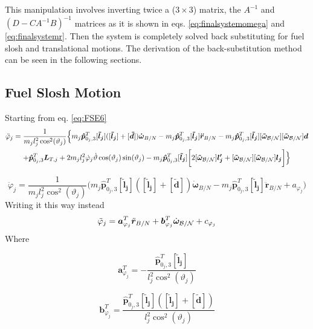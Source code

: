 \documentclass[]{BasiliskReportMemo}
\begin{document}
	This manipulation involves inverting twice a ($3\times 3$) matrix, the $A^{-1}$ and $(D-CA^{-1}B)^{-1}$ matrices as it is shown in eqs. \eqref{eq:finalsystemomega}  and \eqref{eq:finalsystemr}. Then the system is completely solved back substituting for fuel slosh and translational motions. The derivation of the back-substitution method can be seen in the following sections. 
	\\
	
	\subsection{Fuel Slosh Motion}
	Starting from eq. \eqref{eq:FSE6}
    \begin{multline}
	\ddot{\varphi}_j  =\frac{1}{m_j l_j^2 \cos^2(\vartheta_j)}\Big\{m_{j}\bm{\hat{p}}_{0_j,3}^T [\bm{\tilde{l}_j}]( [\bm{\tilde{l}_j}]+[\bm{\tilde{d}}]) \bm{\dot{\omega}}_{B/N} -m_{j} \bm{\hat{p}}_{0_j,3}^{T} [\bm{\tilde{l}_j}] \bm{\ddot{r}}_{B/N} -m_{j} \bm{\hat{p}}_{0_j,3}^{T} [\bm{\tilde{l}_j}][\bm{\tilde{\omega}}_{\cal B/N}][\bm{\tilde{\omega}}_{\cal B/N}] \bm{d}\\+\bm{\hat{p}}_{0_j,3}^T \bm{L}_{T,j}+2m_j l_j^2\dot{\varphi}_j\dot{\vartheta}\cos(\vartheta_j)\sin(\vartheta_j)- m_j \bm{\hat{p}}_{0_j,3}^T [\bm{\tilde{l}_j}]\bigg[2[\bm{\tilde{\omega}}_{\cal B/N}] \bm{l_j'}+[\bm{\tilde{\omega}}_{\cal B/N}][\bm{\tilde{\omega}}_{\cal B/N}] \bm{l_j}\bigg]\Big\}
	\label{eq:BSM1}
	\end{multline}
	
	\begin{equation}
	\ddot{\varphi}_j  =\frac{1}{m_j l_j^2 \cos^2(\vartheta_j)}\Big(m_{j}\bm{\hat{p}}_{0_j,3}^T [\bm{\tilde{l}_j}](  [\bm{\tilde{l}_j}]+ [\bm{\tilde{d}}]) \bm{\dot{\omega}}_{B/N} -m_{j} \bm{\hat{p}}_{0_j,3}^{T} [\bm{\tilde{l}_j}] \bm{\ddot{r}}_{B/N}+a_{\varphi_j} \Big)
	\label{eq:BSM2}
	\end{equation}	
	Writing it this way instead
	\begin{equation}
	\ddot{\varphi}_j  = \bm a_{\varphi_j}^T \ddot{\bm{r}}_{B/N} + \bm b_{\varphi_j}^T \dot{\bm\omega}_{\cal B/N} +c_{\varphi_j}
	\label{eq:BSM3}
	\end{equation}
	Where 
		
	\begin{equation}
	\bm a_{\varphi_j}^{T} = -\frac{\bm{\hat{p}}_{0_j,3}^{T} [\bm{\tilde{l}_j}]}{ l_j^2 \cos^2(\vartheta_j)}
	\label{eq:BSM4}
	\end{equation}
		
	\begin{equation}
	\bm b_{\varphi_j}^{T} = \frac{\bm{\hat{p}}_{0_j,3}^T [\bm{\tilde{l}_j}]( [\bm{\tilde{l}_j}]+ [\bm{\tilde{d}}])}{ l_j^2 \cos^2(\vartheta_j)}
	\label{eq:BSM5}
	\end{equation}
\end{document}
